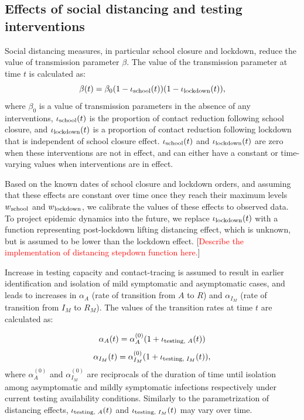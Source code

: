 \documentclass[11pt]{article}
\newcommand{\comments}[1]{[\textcolor{red}{#1}]}
\begin{document}
\subsection{Effects of social distancing and testing interventions} 
Social distancing measures, in particular school closure and lockdown, reduce the value of transmission parameter $\beta$. The value of the transmission parameter at time $t$ is calculated as:
\[ \beta(t) = \beta_0 (1 - \iota\textsubscript{school}(t) ) (1 - \iota\textsubscript{lockdown} (t) ), \]
where $\beta_0$ is a value of transmission parameters in the absence of any interventions, $\iota\textsubscript{school}(t)$ is the proportion of contact reduction following school closure, and $\iota\textsubscript{lockdown} (t)$ is a proportion of contact reduction following lockdown that is independent of school closure effect. $\iota\textsubscript{school}(t)$ and $\iota\textsubscript{lockdown} (t)$ are zero when these interventions are not in effect, and can either have a constant or time-varying values when interventions are in effect. 

Based on the known dates of school closure and lockdown orders, and assuming that these effects are constant over time once they reach their maximum levels $w\textsubscript{school}$ and $w\textsubscript{lockdown}$, we calibrate the values of these effects to observed data. To project epidemic dynamics into the future, we replace  $\iota\textsubscript{lockdown} (t)$ with a function representing post-lockdown lifting distancing effect, which is unknown, but is assumed to be lower than the lockdown effect. 
\comments{Describe the implementation of distancing stepdown function here.}

Increase in testing capacity and contact-tracing is assumed to result in earlier identification and isolation of mild symptomatic and asymptomatic cases, and leads to increases in $\alpha_A$ (rate of transition from $A$ to $R$) and $\alpha_{I_M}$ (rate of transition from $I_M$ to $R_M$). The values of the transition rates at time $t$ are calculated as:

\[ \alpha_A(t) = \alpha_A^{(0)} (1 + \iota\textsubscript{testing, $A$} (t)) \]
\[ \alpha_{I_M}(t) = \alpha_{I_M}^{(0)} (1 + \iota\textsubscript{testing, $I_M$} (t)), \]
where $\alpha_A^{(0)}$ and $\alpha_{I_M}^{(0)}$ are reciprocals of the duration of time until isolation among asymptomatic and mildly symptomatic infections respectively under current testing availability conditions. Similarly to the parametrization of distancing effects, $\iota\textsubscript{testing, $A$} (t)$ and $\iota\textsubscript{testing, $I_M$} (t)$ may vary over time. 
\end{document}
